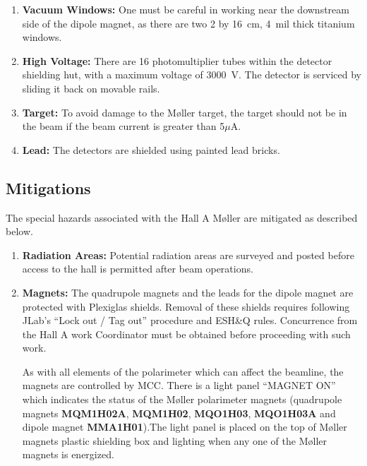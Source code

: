 \begin{safetyen}{0}{0}
\begin{enumerate}
{



}
\item{{\bf Vacuum Windows:}
One must be careful in working near the downstream side of the dipole
magnet, as there are two 2 by 16~cm, 4~mil thick titanium windows.
}
\item{{\bf High Voltage:}
There are 16 photomultiplier tubes within the detector shielding hut, with a maximum voltage of 3000~V. The detector is serviced by sliding it back on movable rails. 
}
\item{{\bf Target:}
To avoid damage to the M{\o}ller target, the target should not be in the beam 
if the beam current is greater than 5$\mu$A. 
}
\item{{\bf Lead:}
The detectors are shielded using painted lead bricks.
}
\end{enumerate}
\subsection{Mitigations}
The special hazards associated with the Hall A M\o ller are mitigated as
described below.
\begin{enumerate}
\item{{\bf Radiation Areas:} Potential radiation areas are surveyed and posted before access to the hall is permitted after beam operations.}
\item{{\bf Magnets:} The quadrupole magnets and the leads for the dipole magnet are protected with Plexiglas shields. 
Removal of these shields requires following JLab's ``Lock out / Tag out'' procedure and ESH\&Q rules.
Concurrence from the Hall A work Coordinator must be obtained before proceeding with such work. 

As with all elements of the polarimeter which can affect the beamline, the magnets 
are controlled by MCC. There is a light panel ``MAGNET ON'' 
which indicates the status of the M{\o}ller polarimeter magnets (quadrupole magnets 
{\bf MQM1H02A}, {\bf MQM1H02}, {\bf MQO1H03}, {\bf MQO1H03A} and dipole magnet 
{\bf MMA1H01}).The light panel is placed on the top of M{\o}ller magnets plastic 
shielding box and lighting when any one of the M{\o}ller magnets is energized.

}
\end{enumerate}
\end{safetyen}
